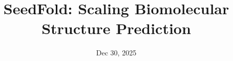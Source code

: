\documentclass[]{bytedance_seed}
\title{SeedFold: Scaling Biomolecular Structure Prediction}
\affiliation[1]{ByteDance Seed}
\date{Dec 30, 2025}
\begin{document}
\maketitle








\clearpage


% 


\clearpage

\beginappendix


\end{document}
